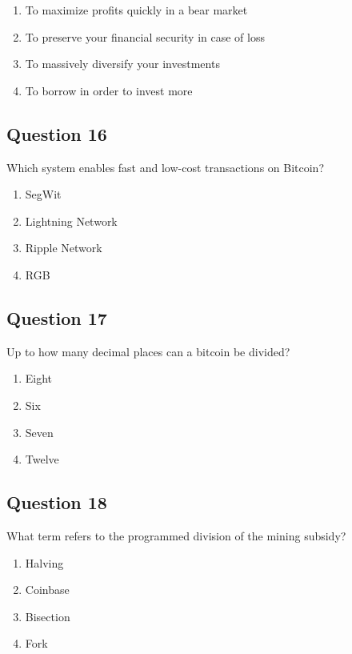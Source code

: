 \documentclass[12pt,a4paper]{article}
\begin{document}
\begin{enumerate}[label=\Alph*., leftmargin=*]
\item To maximize profits quickly in a bear market
\item To preserve your financial security in case of loss
\item To massively diversify your investments
\item To borrow in order to invest more
\end{enumerate}

\bigskip


\subsection*{Question 16}
Which system enables fast and low-cost transactions on Bitcoin?

\begin{enumerate}[label=\Alph*., leftmargin=*]
\item SegWit
\item Lightning Network
\item Ripple Network
\item RGB
\end{enumerate}

\bigskip


\subsection*{Question 17}
Up to how many decimal places can a bitcoin be divided?

\begin{enumerate}[label=\Alph*., leftmargin=*]
\item Eight
\item Six
\item Seven
\item Twelve
\end{enumerate}

\bigskip


\subsection*{Question 18}
What term refers to the programmed division of the mining subsidy?

\begin{enumerate}[label=\Alph*., leftmargin=*]
\item Halving
\item Coinbase
\item Bisection
\item Fork
\end{enumerate}
\end{document}

